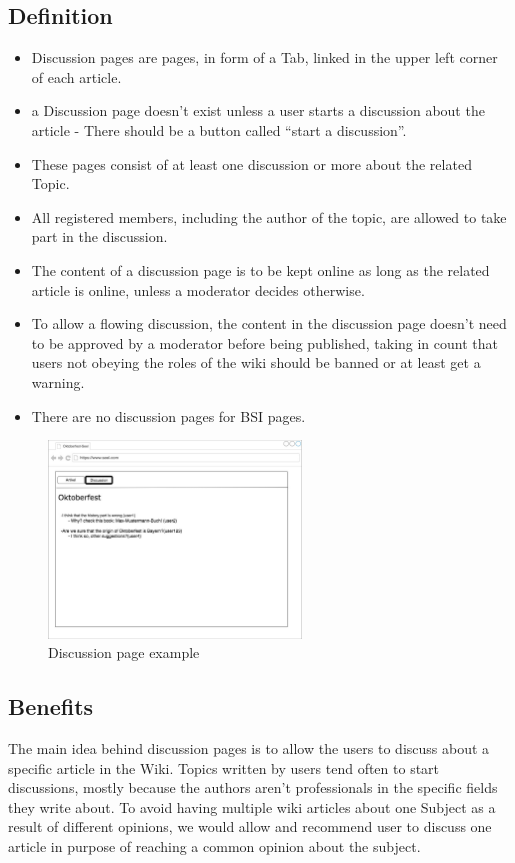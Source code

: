 \subsection{Definition}
\begin{itemize}
\item Discussion pages are pages, in form of a Tab, linked in the upper left corner of each article. 
\item a Discussion page doesn’t exist unless a user starts a discussion about the article - There should be a button called “start a discussion”.
\item These pages consist of at least one discussion or more about the related Topic. 
\item All registered members, including the author of the topic, are allowed to take part in the discussion.
\item The content of a discussion page is to be kept online as long as the related article is online, unless a moderator decides otherwise.
\item To allow a flowing discussion, the content in the discussion page doesn’t need to be approved by a moderator before being published, taking in count that users not obeying the roles of the wiki should be banned or at least get a warning.
\item There are no discussion pages for BSI pages.
 \end{itemize}

 \begin{figure}[h] 
    \centering
    \includegraphics[width=0.6\textwidth]{Pictures/discussion1.jpg}
    \caption{Discussion page example}
\end{figure} 

\subsection{Benefits}
The main idea behind discussion pages is to allow the users to discuss about a specific article in the Wiki.
Topics written by users tend often to start discussions, mostly because the authors aren’t professionals in the specific fields they write about. To avoid having multiple wiki articles about one Subject as a result of different opinions, we would allow and recommend user to discuss one article in purpose of reaching a common opinion about the subject.

